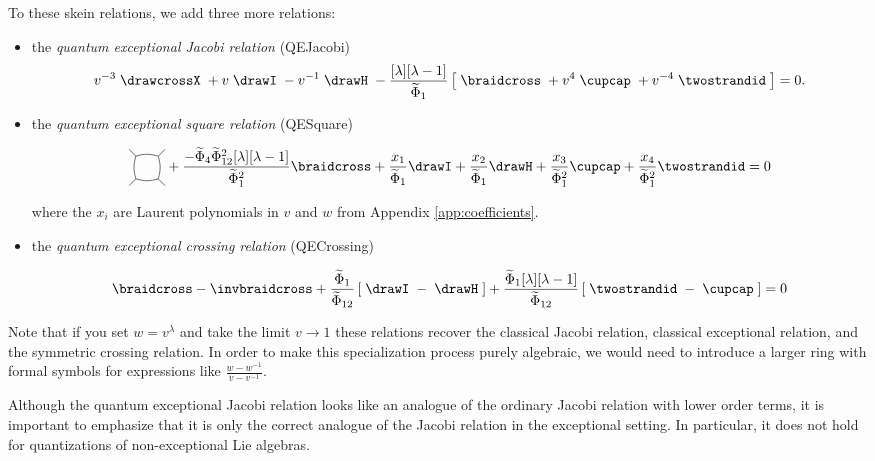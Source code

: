 \documentclass[12pt]{amsart}
\begin{document}
\begin{definition}
To these skein relations, we add three more relations:
\begin{itemize}
\item the \emph{quantum exceptional Jacobi relation} (QEJacobi)
\begin{equation}
v^{-3} \;
\drawcrossX
\;+ v \;
\drawI
\; -v^{-1} \;
 \drawH
\;
 - \frac{[\lambda][\lambda-1]}{\widetilde{\Phi}_1}
\left[\; \braidcross \;
 + v^{4}\;
\cupcap
\; + v^{-4} \;
 \twostrandid \;
 \right] = 0.\label{eq:quant-except-spec}
\end{equation}

\item the \emph{quantum exceptional square relation} (QESquare)

\begin{equation}
\label{eq:QESquare-w}
\ngon[45]{4} + \frac{-\widetilde{\Phi}_4\widetilde{\Phi}_{12}^2[\lambda][\lambda-1]}{\widetilde{\Phi}_1^2} \braidcross + \frac{x_1}{\widetilde{\Phi}_1} \drawI + \frac{x_2}{\widetilde{\Phi}_1} \drawH + \frac{x_3}{\widetilde{\Phi}_1^2} \cupcap + \frac{x_4}{\widetilde{\Phi}_1^2} \twostrandid =0
\end{equation}

where the $x_i$ are Laurent polynomials in $v$ and $w$ from Appendix \ref{app:coefficients}.

\item the \emph{quantum exceptional crossing relation} (QECrossing)

\begin{equation}
\label{eq:QECrossing-w}
\braidcross - \invbraidcross + \frac{\widetilde{\Phi}_1}{\widetilde{\Phi}_{12}} \left[\; \drawI \; - \; \drawH \; \right] + \frac{\widetilde{\Phi}_1 [\lambda][\lambda-1]}{\widetilde{\Phi}_{12}} \left[\; \twostrandid \; - \; \cupcap \; \right] = 0
\end{equation}


\end{itemize}
\end{definition}

Note that if you set $w = v^\lambda$ and take the limit $v \rightarrow 1$ these relations recover the classical Jacobi relation, classical exceptional relation, and the symmetric crossing relation.  In order to make this specialization process purely algebraic, we would need to introduce a larger ring with formal symbols for expressions like $\frac{w-w^{-1}}{v-v^{-1}}$.

\begin{warning}
Although the quantum exceptional Jacobi relation looks like an analogue of the ordinary Jacobi relation with lower order terms, it is important to emphasize that it is only the correct analogue of the Jacobi relation in the exceptional setting.  In particular, it does not hold for quantizations of non-exceptional Lie algebras.
\end{warning}
\end{document}
